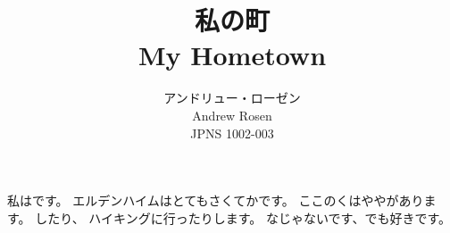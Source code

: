 \documentclass[12pt,a4paper]{article}
\title{私の町\\\small{My Hometown}}
\author{アンドリュー・ローゼン\\ \small{Andrew Rosen}\\\small{JPNS 1002-003}}
\date{}
\begin{document}
	\maketitle
	
	\doublespacing
	
	私はです。
	エルデンハイムはとてもさくてかです。	
	ここのくはややがあります。
	したり、 ハイキングに行ったりします。
	なじゃないです、でも好きです。
	
\end{document}
